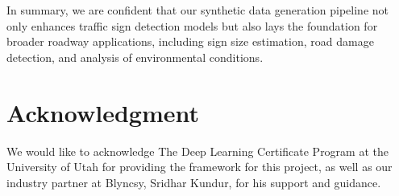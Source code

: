 \documentclass[journal]{IEEEtran}
\begin{document}
In summary, we are confident that our synthetic data generation pipeline not only enhances traffic sign detection models but also lays the foundation for broader roadway applications, including sign size estimation, road damage detection, and analysis of environmental conditions.

\section*{Acknowledgment}
We would like to acknowledge The Deep Learning Certificate Program at the University of Utah for providing the framework for this project, as well as our industry partner at Blyncsy, Sridhar Kundur, for his support and guidance. 

\ifCLASSOPTIONcaptionsoff
  \newpage
\fi





%
%
%


{\small


}
% 
\end{document}
